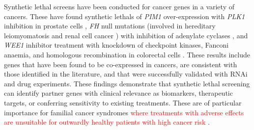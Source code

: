 
Synthetic lethal screens have been conducted for \glspl{cancer gene} in a variety of \glspl{cancer}.  These have found \glspl{synthetic lethal} of \textit{PIM1} over-expression with \textit{PLK1} inhibition  in prostate cells \citep{vanderMeer2014}, \textit{FH} null mutations (involved in hereditary leiomyomatosis and renal cell cancer ) with inhibition of adenylate cyclases \citep{Boettcher2014}, and \textit{WEE1} inhibitor treatment with knockdown of checkpoint kinases, Fanconi anaemia, and homologous recombination in colorectal cells \citep{Aarts2015}. These results include genes that have been found to be co-expressed in cancers, are consistent with those identified in the literature, and that were successfully validated with \gls{RNAi} and drug experiments. These findings demonstrate that \gls{synthetic lethal} screening can identify partner genes with clinical relevance as biomarkers, therapeutic targets, or conferring sensitivity to existing treatments. These are of particular importance for familial cancer syndromes \textcolor{red}{where treatments with adverse effects are unsuitable for outwardly healthy patients with high cancer risk} \citep{Boettcher2014, Telford2015}.

